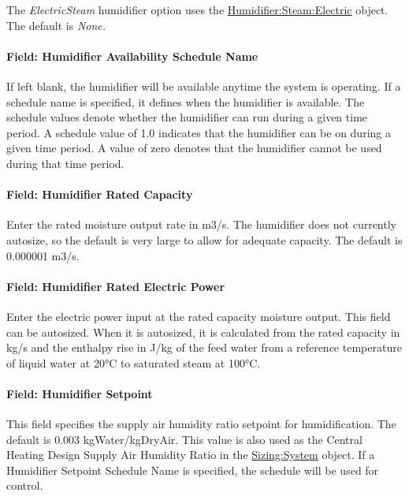 The \emph{ElectricSteam} humidifier option uses the \hyperref[humidifiersteamelectric]{Humidifier:Steam:Electric} object. The default is \emph{None.}

\paragraph{Field: Humidifier Availability Schedule Name}\label{field-humidifier-availability-schedule-name-7}

If left blank, the humidifier will be available anytime the system is operating. If a schedule name is specified, it defines when the humidifier is available. The schedule values denote whether the humidifier can run during a given time period. A schedule value of 1.0 indicates that the humidifier can be on during a given time period. A value of zero denotes that the humidifier cannot be used during that time period.

\paragraph{Field: Humidifier Rated Capacity}\label{field-humidifier-rated-capacity-7}

Enter the rated moisture output rate in m3/s. The humidifier does not currently autosize, so the default is very large to allow for adequate capacity. The default is 0.000001 m3/s.

\paragraph{Field: Humidifier Rated Electric Power}\label{field-humidifier-rated-electric-power-7}

Enter the electric power input at the rated capacity moisture output. This field can be autosized. When it is autosized, it is calculated from the rated capacity in kg/s and the enthalpy rise in J/kg of the feed water from a reference temperature of liquid water at 20°C to saturated steam at 100°C.

\paragraph{Field: Humidifier Setpoint}\label{field-humidifier-setpoint-4}

This field specifies the supply air humidity ratio setpoint for humidification. The default is 0.003 kgWater/kgDryAir. This value is also used as the Central Heating Design Supply Air Humidity Ratio in the \hyperref[sizingsystem]{Sizing:System} object. If a Humidifier Setpoint Schedule Name is specified, the schedule will be used for control.

